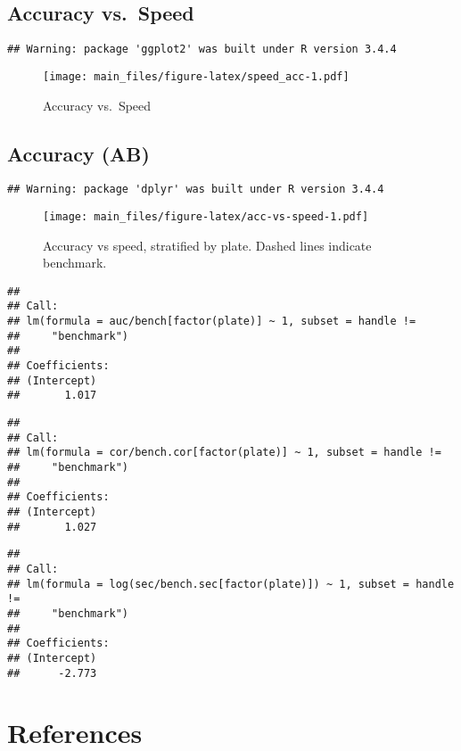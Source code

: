 \documentclass[]{article}
\begin{document}
\hypertarget{accuracy-vs.-speed}{%
\subsection{Accuracy vs.~Speed}\label{accuracy-vs.-speed}}

\begin{verbatim}
## Warning: package 'ggplot2' was built under R version 3.4.4
\end{verbatim}

\begin{figure}
\centering
\texttt{[image: main\_files/figure-latex/speed\_acc-1.pdf]}
\caption{\label{speed_acc}Accuracy vs.~Speed}
\end{figure}

\hypertarget{accuracy-ab}{%
\subsection{Accuracy (AB)}\label{accuracy-ab}}

\begin{verbatim}
## Warning: package 'dplyr' was built under R version 3.4.4
\end{verbatim}

\begin{figure}
\centering
\texttt{[image: main\_files/figure-latex/acc-vs-speed-1.pdf]}
\caption{Accuracy vs speed, stratified by plate. Dashed lines indicate
benchmark.}
\end{figure}

\begin{verbatim}
## 
## Call:
## lm(formula = auc/bench[factor(plate)] ~ 1, subset = handle != 
##     "benchmark")
## 
## Coefficients:
## (Intercept)  
##       1.017
\end{verbatim}

\begin{verbatim}
## 
## Call:
## lm(formula = cor/bench.cor[factor(plate)] ~ 1, subset = handle != 
##     "benchmark")
## 
## Coefficients:
## (Intercept)  
##       1.027
\end{verbatim}

\begin{verbatim}
## 
## Call:
## lm(formula = log(sec/bench.sec[factor(plate)]) ~ 1, subset = handle != 
##     "benchmark")
## 
## Coefficients:
## (Intercept)  
##      -2.773
\end{verbatim}

\hypertarget{references}{%
\section{References}\label{references}}
\end{document}

